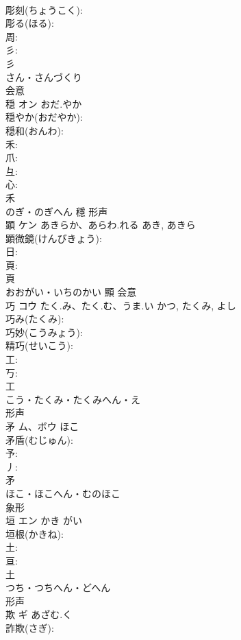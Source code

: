 \documentclass[8pt]{extreport}
\begin{document}
\begin{CJK}{UTF8}{min}
\\	彫刻(ちょうこく): 
\\	彫る(ほる): 
\\	周: 
\\	彡: 
\\	彡	
\\	さん・さんづくり	
\\	会意 
\\	穏	オン	おだ.やか		
\\	穏やか(おだやか): 
\\	穏和(おんわ): 
\\	禾: 
\\	爪: 
\\	彑: 
\\	心: 
\\	禾	
\\	のぎ・のぎへん	穩	形声 
\\	顕	ケン	あきらか、あらわ.れる	あき, あきら	
\\	顕微鏡(けんびきょう): 
\\	日: 
\\	頁: 
\\	頁	
\\	おおがい・いちのかい	顯	会意 
\\	巧	コウ	たく.み、たく.む、うま.い	かつ, たくみ, よし	
\\	巧み(たくみ): 
\\	巧妙(こうみょう): 
\\	精巧(せいこう): 
\\	工: 
\\	丂: 
\\	工	
\\	こう・たくみ・たくみへん・え	
\\	形声 
\\	矛	ム、ボウ	ほこ		
\\	矛盾(むじゅん): 
\\	予: 
\\	丿: 
\\	矛	
\\	ほこ・ほこへん・むのほこ	
\\	象形 
\\	垣	エン	かき	がい	
\\	垣根(かきね): 
\\	土: 
\\	亘: 
\\	土	
\\	つち・つちへん・どへん	
\\	形声 
\\	欺	ギ	あざむ.く		
\\	詐欺(さぎ): 

\end{CJK}
\end{document}
